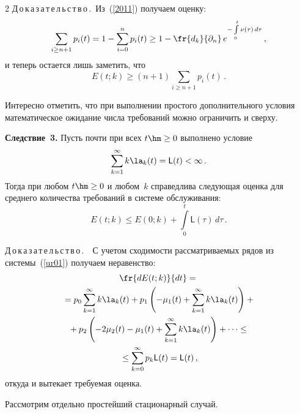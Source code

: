 \begin{multicols}{2}
\noindent
Д\,о\,к\,а\,з\,а\,т\,е\,л\,ь\,с\,т\,в\,о\,.\
Из~(\ref{2011}) получаем оценку:
\begin{equation*}
\sum_{i \ge n+1} p_i (t) = 1 - \sum\limits_{i=0}^{n } p_i (t) \ge 1 -
\fr{d_k}{{\partial}_n}\, e^{-\int\limits_0^t \nu(\tau) \, d\tau}\,, 
\end{equation*}
и теперь остается лишь заметить, что  
$$
E(t;k) \ge \left(n+1\right) \sum\limits_{i \ge n+1} p_i (t)\,.
$$

\smallskip

Интересно отметить, что при выполнении прос\-то\-го дополнительного условия математическое 
ожидание числа требований можно ограничить и сверху.

\medskip

\noindent
\textbf{Следствие~3.}
Пусть почти при всех $t \hm\ge 0$ выполнено условие
\begin{equation*}
\sum\limits_{k=1}^{\infty}k\la_k(t) = {\sf L}(t) < \infty\,.
\end{equation*}
Тогда при любом $t \hm\ge 0$ и любом~$k$ справедлива следующая оценка для среднего количества требований в системе обслуживания:
\begin{equation*}
E(t;k) \le E(0;k) + \int\limits_0^t \textsf{L}(\tau) \, d\tau\,.  
\end{equation*}

\noindent
Д\,о\,к\,а\,з\,а\,т\,е\,л\,ь\,с\,т\,в\,о\,.\ \ 
С учетом сходимости рас\-смат\-ри\-ва\-емых рядов из системы~(\ref{ur01}) получаем неравенство:
\begin{multline*}
\fr{dE(t;k)}{dt} ={}\\
{}= p_0\sum\limits_{k=1}^{\infty}k\la_k(t) + 
p_1 \left(-\mu_1(t)+\sum\limits_{k=1}^{\infty}k\la_k(t)\right) +{} \\
{}+p_2 \left(-2\mu_2(t)-\mu_1(t)+\sum\limits_{k=1}^{\infty}k\la_k(t)\right) + 
\cdots\le{}\\
{}\le \sum\limits_{k=0}^{\infty}p_k {\sf L}(t) = {\sf L}(t)\,, 
\end{multline*}
откуда и вытекает требуемая оценка.

\smallskip

Рассмотрим отдельно простейший стационарный случай.

\smallskip



\end{multicols}
